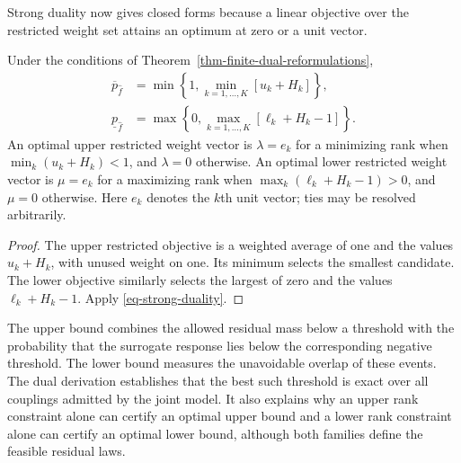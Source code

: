 Strong duality now gives closed forms because a linear objective over the restricted weight set attains an optimum at zero or a unit vector.

\begin{corollary}
  \label{thm-closed-form-bounds}
  Under the conditions of Theorem~\ref{thm-finite-dual-reformulations},
  \begin{align}
    \overline p_{\hat f}
    &=\min\left\{1,\min_{k=1,\ldots,K}\left[u_k+H_k\right]\right\},
    \label{eq-dw-closed-upper}\\
    \underline p_{\hat f}
    &=\max\left\{0,\max_{k=1,\ldots,K}\left[\ell_k+H_k-1\right]\right\}.
    \label{eq-dw-closed-lower}
  \end{align}
  An optimal upper restricted weight vector is $\lambda=e_k$ for a minimizing rank when $\min_k(u_k+H_k)<1$, and $\lambda=0$ otherwise. An optimal lower restricted weight vector is $\mu=e_k$ for a maximizing rank when $\max_k(\ell_k+H_k-1)>0$, and $\mu=0$ otherwise. Here $e_k$ denotes the $k$th unit vector; ties may be resolved arbitrarily.
\end{corollary}
\begin{proof}
  The upper restricted objective is a weighted average of one and the values $u_k+H_k$, with unused weight on one. Its minimum selects the smallest candidate. The lower objective similarly selects the largest of zero and the values $\ell_k+H_k-1$. Apply \eqref{eq-strong-duality}.
\end{proof}

The upper bound combines the allowed residual mass below a threshold with the probability that the surrogate response lies below the corresponding negative threshold. The lower bound measures the unavoidable overlap of these events. The dual derivation establishes that the best such threshold is exact over all couplings admitted by the joint model. It also explains why an upper rank constraint alone can certify an optimal upper bound and a lower rank constraint alone can certify an optimal lower bound, although both families define the feasible residual laws.

